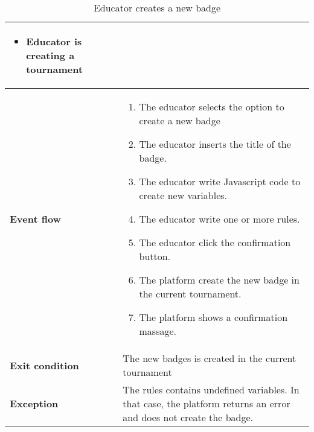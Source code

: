 \begin{enumerate}[label=\textbf{UC\arabic*}:,ref=UC\arabic*,leftmargin=1.3cm]
{\begin{table}[H]
\begin{tabular}{|l|p{11.9cm}|}
\begin{itemize}
                              \item Educator is creating a tournament
                        \end{itemize}                                         \\\hline
                        \textbf{Event flow}      &
                        \begin{enumerate}[label=\arabic*.]
                              \item The educator selects the option to create a new badge
                              \item The educator inserts the title of the badge.
                              \item The educator write Javascript code to create new variables.
                              \item The educator write one or more rules.
                              \item The educator click the confirmation button.
                              \item The platform create the new badge in the current tournament.
                              \item The platform shows a confirmation massage.
                        \end{enumerate}              \\\hline
                        \textbf{Exit condition}  & The new badges is created in the current tournament \\\hline
                        \textbf{Exception}       & The rules contains undefined variables.
                        In that case, the platform returns an error and does not create the badge.     \\\hline
                  \end{tabular}
                  \caption{Educator creates a new badge }
                  \label{table:Educator creates a new badge }
            \end{table}
            \begin{adjustbox}{
                        max size={\textwidth}{},
                        caption={Educator creates a new badge},
                        label={fig:Educator creates a new badge},
                        figure=H}
                  \centering
            \end{adjustbox}
            \pagebreak
      }
\end{enumerate}

